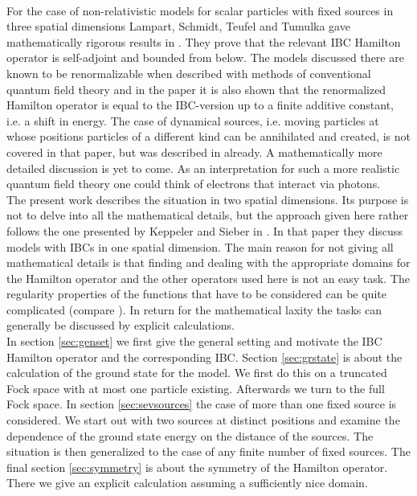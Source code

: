 \\
For the case of non-relativistic models for scalar particles with fixed sources in three spatial dimensions Lampart, Schmidt, Teufel and Tumulka gave mathematically rigorous results in \cite{7f9f7f95}. They prove that the relevant IBC Hamilton operator is self-adjoint and bounded from below. The models discussed there are known to be renormalizable when described with methods of conventional quantum field theory and in the paper it is also shown that the renormalized Hamilton operator is equal to the IBC-version up to a finite additive constant, i.e. a shift in energy. The case of dynamical sources, i.e. moving particles at whose positions particles of a different kind can be annihilated and created, is not covered in that paper, but was described in \cite{f5e1d34b} already. A mathematically more detailed discussion is yet to come. As an interpretation for such a more realistic quantum field theory one could think of electrons that interact via photons.
\\
The present work describes the situation in two spatial dimensions. Its purpose is not to delve into all the mathematical details, but the approach given here rather follows the one presented by Keppeler and Sieber in \cite{3d622ca2}. In that paper they discuss models with IBCs in one spatial dimension. The main reason for not giving all mathematical details is that finding and dealing with the appropriate domains for the Hamilton operator and the other operators used here is not an easy task. The regularity properties of the functions that have to be considered can be quite complicated (compare \cite{7f9f7f95}). In return for the mathematical {\glqq}laxity{\grqq} the tasks can generally be discussed by explicit calculations.
\\
In section \ref{sec:genset} we first give the general setting and motivate the IBC Hamilton operator and the corresponding IBC. Section \ref{sec:grstate} is about the calculation of the ground state for the model. We first do this on a truncated Fock space with at most one particle existing. Afterwards we turn to the full Fock space. In section \ref{sec:sevsources} the case of more than one fixed source is considered. We start out with two sources at distinct positions and examine the dependence of the ground state energy on the distance of the sources. The situation is then generalized to the case of any finite number of fixed sources. The final section \ref{sec:symmetry} is about the symmetry of the Hamilton operator. There we give an explicit calculation assuming a sufficiently nice domain.
